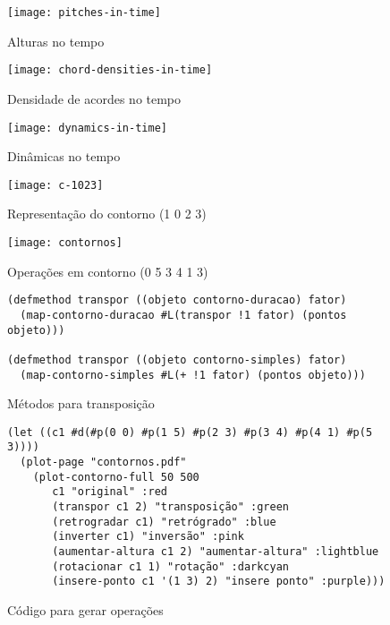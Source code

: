 \documentclass{sciposter}
\begin{document}
\begin{center}

\begin{multicols}{2}

  \begin{figure}
    \centering
    \texttt{[image: pitches-in-time]}
    \caption{Alturas no tempo}
    \label{fig:pitches-in-time}
  \end{figure}

  \begin{figure}
    \centering
    \texttt{[image: chord-densities-in-time]}
    \caption{Densidade de acordes no tempo}
    \label{fig:chord-densities-in-time}
  \end{figure}

  \begin{figure}
    \centering
    \texttt{[image: dynamics-in-time]}
    \caption{Dinâmicas no tempo}
    \label{fig:dynamics-in-time}
  \end{figure}

  \begin{figure}
    \centering
    \texttt{[image: c-1023]}
    \caption{Representação do contorno (1 0 2 3)}
    \label{fig:repr-1023}
  \end{figure}

\begin{figure}
  \centering
  \texttt{[image: contornos]}
  \caption{Operações em contorno (0 5 3 4 1 3)}
  \label{fig:operacoes}
\end{figure}


\begin{figure}
  \centering
\begin{verbatim}
(defmethod transpor ((objeto contorno-duracao) fator)
  (map-contorno-duracao #L(transpor !1 fator) (pontos objeto)))

(defmethod transpor ((objeto contorno-simples) fator)
  (map-contorno-simples #L(+ !1 fator) (pontos objeto)))
\end{verbatim}
  \label{fig:metodos}
  \caption{Métodos para transposição}
\end{figure}

\begin{figure}
  \centering
\begin{verbatim}
(let ((c1 #d(#p(0 0) #p(1 5) #p(2 3) #p(3 4) #p(4 1) #p(5 3))))
  (plot-page "contornos.pdf"
    (plot-contorno-full 50 500
       c1 "original" :red
       (transpor c1 2) "transposição" :green
       (retrogradar c1) "retrógrado" :blue
       (inverter c1) "inversão" :pink
       (aumentar-altura c1 2) "aumentar-altura" :lightblue
       (rotacionar c1 1) "rotação" :darkcyan
       (insere-ponto c1 '(1 3) 2) "insere ponto" :purple)))
\end{verbatim}
  \label{fig:gera-operacoes}
  \caption{Código para gerar operações}
\end{figure}
  
\end{multicols}

\end{center}
\end{document}

